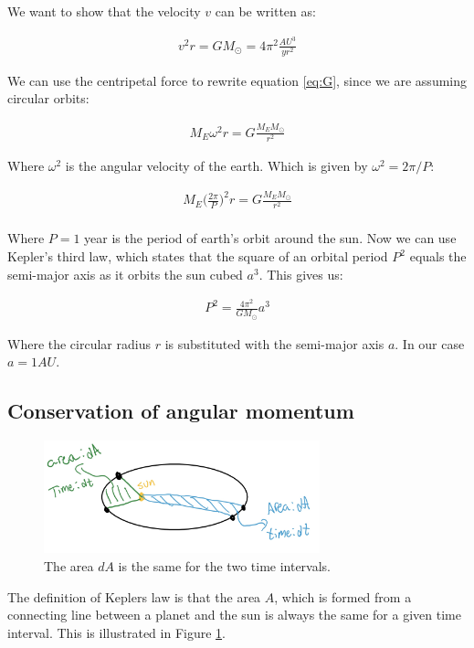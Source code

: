 \documentclass{article}
\begin{document}
We want to show that the velocity $v$ can be written as:

\begin{align}
    v^2r=GM_{\odot}=4\pi^2\frac{AU^3}{yr^2}
    \label{eq:vr}
\end{align}

We can use the centripetal force to rewrite equation \ref{eq:G}, since we are assuming circular orbits:

\begin{align*}
    M_E\omega^2r=G\frac{M_EM_{\odot}}{r^2}
\end{align*}

Where $\omega^2$ is the angular velocity of the earth. Which is given by $\omega^2=2\pi / P$: 

\begin{align*}
    M_E\bigg(\frac{2\pi}{P}\bigg)^2r=G\frac{M_EM_{\odot}}{r^2}\\
\end{align*}

Where $P=1$ year is the period of earth's orbit around the sun.
Now we can use Kepler's third law, which states that the square of an orbital period $P^2$ equals the semi-major axis as it orbits the sun cubed $a^3$. This gives us:

\begin{align}
    P^2=\frac{4\pi^2}{GM_\odot}a^3
\end{align}

Where the circular radius $r$ is substituted with the semi-major axis $a$. In our case $a = 1AU$.  

\subsection{Conservation of angular momentum}

\begin{figure}[H]
	\centering
	\includegraphics[width=80mm]{K2L.jpg}
	\caption{The area $dA$ is the same for the two time intervals.}
	\label{fig:Kep}
\end{figure}

The definition of Keplers law is that the area $A$, which is formed from a connecting line between a planet and the sun is always the same for a given time interval. This is illustrated in Figure \ref{fig:Kep}.
\end{document}
